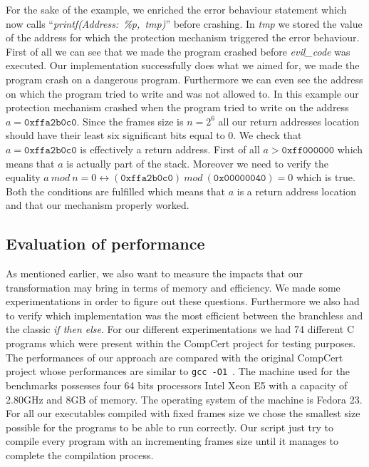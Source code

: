 \documentclass[11pt]{sdm}
\begin{document}
For the sake of the example, we enriched the error behaviour statement which now calls  ``\textit{printf(Address:~\%p,~tmp)}'' before crashing. In \textit{tmp} we stored the value of the address for which the protection mechanism triggered the error behaviour.
First of all we can see that we made the program crashed before \textit{evil\_code} was executed. Our implementation successfully does what we aimed for, we made the program crash on a dangerous program.
Furthermore we can even see the address on which the program tried to write and was not allowed to. In this example our protection mechanism crashed when the program tried to write on the address $a=\texttt{0xffa2b0c0}$. 
Since the frames size is $n=2^6$ all our return addresses location should have their least six significant bits equal to 0.
We check that $a=\texttt{0xffa2b0c0}$ is effectively a return address. First of all $a>\texttt{0xff000000}$ which means that $a$ is actually part of the stack. Moreover we need to verify the equality $a~mod~n=0 \leftrightarrow (\texttt{0xffa2b0c0})~mod~(\texttt{0x00000040}) = 0$ which is true. 
Both the conditions are fulfilled which means that $a$ is a return address location and that our mechanism properly worked.


\subsection{Evaluation of performance}

As mentioned earlier, we also want to measure the impacts that our transformation may bring in terms of memory and efficiency.
We made some experimentations in order to figure out these questions.
Furthermore we also had to verify which implementation was the most efficient between the branchless and the classic \textit{if then else}.
For our different experimentations we had 74 different C programs which were present within the CompCert project for testing purposes.
The performances of our approach are compared with the original CompCert project whose performances are similar to \texttt{gcc -O1}~\cite{Leroy:2009:FVR:1538788.1538814}.
The machine used for the benchmarks possesses four 64 bits processors Intel Xeon E5 with a capacity of 2.80GHz and 8GB of memory. The operating system of the machine is Fedora 23.
For all our executables compiled with fixed frames size we chose the smallest size possible for the programs to be able to run correctly. Our script just try to compile every program with an incrementing frames size until it manages to complete the compilation process.
\end{document}
